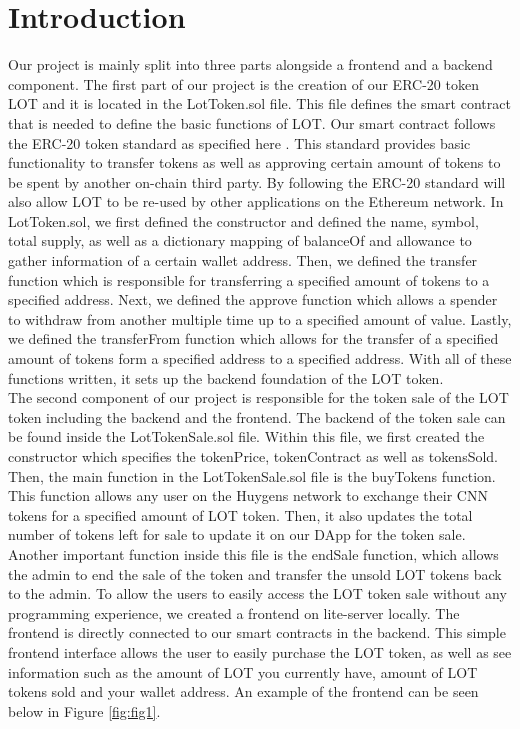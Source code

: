 \documentclass[11pt]{article}
\newcommand {\rfig}[1]{Figure \ref{fig:#1}}
\begin{document}
\section*{Introduction}
Our project is mainly split into three parts alongside a frontend and a backend component. The first part of our project is the creation of our ERC-20 token LOT and it is located in the LotToken.sol file. This file defines the smart contract that is needed to define the basic functions of LOT. Our smart contract follows the ERC-20 token standard as specified here \parencite{EIP20}. This standard provides basic functionality to transfer tokens as well as approving certain amount of tokens to be spent by another on-chain third party. By following the ERC-20 standard will also allow LOT to be re-used by other applications on the Ethereum network. In LotToken.sol, we first defined the constructor and defined the name, symbol, total supply, as well as a dictionary mapping of balanceOf and allowance to gather information of a certain wallet address. Then, we defined the transfer function which is responsible for transferring a specified amount of tokens to a specified address. Next, we defined the approve function which allows a spender to withdraw from another multiple time up to a specified amount of value. Lastly, we defined the transferFrom function which allows for the transfer of a specified amount of tokens form a specified address to a specified address. With all of these functions written, it sets up the backend foundation of the LOT token.\parencite{Dapp} \\
The second component of our project is responsible for the token sale of the LOT token including the backend and the frontend. The backend of the token sale can be found inside the LotTokenSale.sol file. Within this file, we first created the constructor which specifies the tokenPrice, tokenContract as well as tokensSold. Then, the main function in the LotTokenSale.sol file is the buyTokens function. This function allows any user on the Huygens network \parencite{CCN} to exchange their CNN tokens for a specified amount of LOT token. Then, it also updates the total number of tokens left for sale to update it on our DApp for the token sale. Another important function inside this file is the endSale function, which allows the admin to end the sale of the token and transfer the unsold LOT tokens back to the admin. To allow the users to easily access the LOT token sale without any programming experience, we created a frontend on lite-server locally. The frontend is directly connected to our smart contracts in the backend. This simple frontend interface allows the user to easily purchase the LOT token, as well as see information such as the amount of LOT you currently have, amount of LOT tokens sold and your wallet address. An example of the frontend can be seen below in \rfig{fig1}.\\
\end{document}
